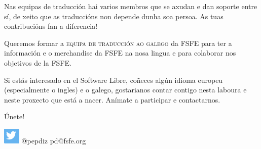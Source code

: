 \documentclass[10pt,foldmark,tumble]{leaflet}
\begin{document}
Nas equipas de traducción hai varios membros que se axudan e dan soporte entre sí, de xeito que as traduccións non depende dunha soa persoa. As tuas contribucións fan a diferencia!



\vspace{10em}

\begin{mdframed}[style=MyFrame]
Queremos formar a \textsc{equipa de traducción ao galego} da FSFE para ter a información e o merchandise da FSFE na nosa lingua e para colaborar nos objetivos de la FSFE.

Si estás interesado en el Software Libre, coñeces algún idioma europeu (especialmente o ingles) e o galego, gostarianos contar contigo nesta laboura e neste proxecto que está a nacer. Anímate a participar e contactarnos.

\center \Huge{Únete!}

\includegraphics[scale=0.8]{tw.png} \Large @pepdiz pd@fsfe.org
\end{mdframed}
\end{document}
